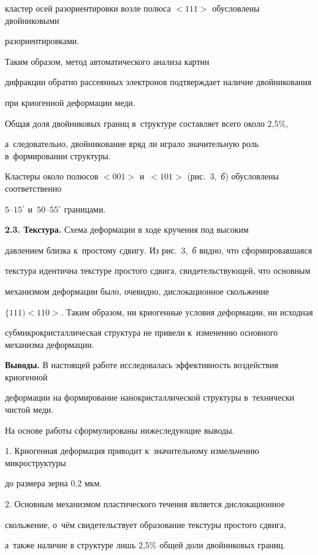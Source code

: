 кластер осей разориентировки возле полюса ${<}111{>}$ обусловлены двойниковыми

разориентировками.

Таким образом, метод автоматического анализа картин

дифракции обратно рассеянных электронов подтверждает наличие двойникования

при криогенной деформации меди.

Общая доля двойниковых границ в~структуре составляет всего около 2,5{\%},

а~следовательно, двойникование вряд ли играло значительную роль в~формировании структуры.

Кластеры около полюсов ${<}001{>}$ и~${<}101{>}$ (рис.~3,~{\sl б}) обусловлены соответственно

$5$--$15^{\circ}$ и~$50$--$55^\circ$ границами.



\textbf{2.3. Текстура.} Схема деформации в ходе кручения под высоким

давлением близка к~простому сдвигу. Из рис.~3,~{\sl б} видно, что сформировавшаяся

текстура идентична текстуре простого сдвига, свидетельствующей, что основным

механизмом деформации было, очевидно, дислокационное скольжение

${\{}111{)}{<}110{>}$. Таким образом, ни криогенные условия деформации, ни исходная

субмикрокристаллическая структура не привели к~изменению основного механизма деформации.



\textbf{Выводы.} В настоящей работе исследовалась эффективность воздействия криогенной

деформации на формирование нанокристаллической структуры в~технически чистой меди.

На основе работы сформулированы нижеследующие выводы.



1. Криогенная деформация приводит к~значительному измельчению микроструктуры

до размера зерна 0,2 мкм.



2. Основным механизмом пластического течения является дислокационное

скольжение, о~чём свидетельствует образование текстуры простого сдвига,

а~также наличие в структуре лишь 2,5{\%} общей доли двойниковых границ.



